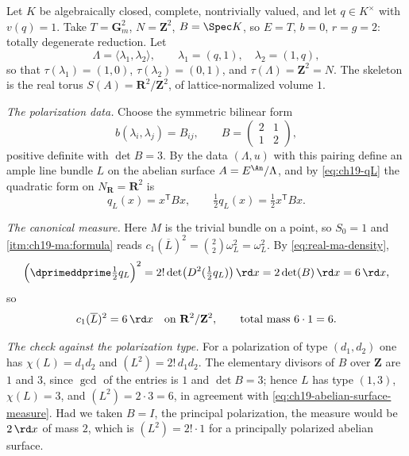 \begin{example}
\label{ex:ch19-abelian-surface-degenerate}
Let $K$ be algebraically closed, complete, nontrivially valued, and let
$q\in K^\times$ with $v(q)=1$.  Take $T=\mathbf G_m^2$,
$N=\mathbf Z^2$, $B=\Spec K$, so $E=T$, $b=0$, $r=g=2$: totally
degenerate reduction.  Let
\[
 \Lambda=\langle\lambda_1,\lambda_2\rangle,
 \qquad \lambda_1=(q,1),\quad \lambda_2=(1,q),
\]
so that $\tau(\lambda_1)=(1,0)$, $\tau(\lambda_2)=(0,1)$, and
$\tau(\Lambda)=\mathbf Z^2=N$.  The skeleton is the real torus
$S(A)=\mathbf R^2/\mathbf Z^2$, of lattice-normalized volume $1$.

\emph{The polarization data.}  Choose the symmetric bilinear form
\[
 b(\lambda_i,\lambda_j)=B_{ij},
 \qquad
 B=\begin{pmatrix}2&1\\1&2\end{pmatrix},
\]
positive definite with $\det B=3$.  By \cite[Theorem~B.6.4]{CLD25} the
data $(\Lambda,u)$ with this pairing define an ample line bundle $L$ on
the abelian surface $A=E^{\An}/\Lambda$, and by \eqref{eq:ch19-qL} the
quadratic form on $N_{\mathbf R}=\mathbf R^2$ is
\[
 q_L(x)=x^{\mathsf T}Bx,
 \qquad
 \tfrac12q_L(x)=\tfrac12x^{\mathsf T}Bx .
\]

\emph{The canonical measure.}  Here $M$ is the trivial bundle on a point,
so $S_0=1$ and \,\cref{itm:ch19-ma:formula}
reads $c_1(\overline L)^2=\binom22\omega_L^2=\omega_L^2$.  By
\eqref{eq:real-ma-density},
\[
 \Bigl(\dprimeddprime\tfrac12q_L\Bigr)^2
 =2!\det\bigl(D^2(\tfrac12q_L)\bigr)\,\rd x
 =2\det(B)\,\rd x
 =6\,\rd x ,
\]
so
\begin{equation}
\label{eq:ch19-abelian-surface-measure}
 c_1(\overline L)^2=6\,\rd x
 \quad\text{on }\mathbf R^2/\mathbf Z^2,
 \qquad\text{total mass }6\cdot1=6 .
\end{equation}

\emph{The check against the polarization type.}  For a polarization of type
$(d_1,d_2)$ one has $\chi(L)=d_1d_2$ and $(L^2)=2!\,d_1d_2$.  The
elementary divisors of $B$ over $\mathbf Z$ are $1$ and $3$, since
$\gcd$ of the entries is $1$ and $\det B=3$; hence $L$ has type
$(1,3)$, $\chi(L)=3$, and $(L^2)=2\cdot3=6$, in agreement with
\eqref{eq:ch19-abelian-surface-measure}.  Had we taken $B=I$, the
principal polarization, the measure would be $2\,\rd x$ of mass $2$,
which is $(L^2)=2!\cdot1$ for a principally polarized abelian surface.


\end{example}

